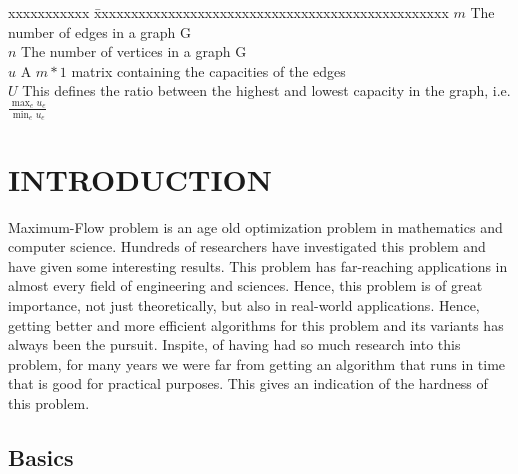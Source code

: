 \documentclass[BTech]{iitmdiss}
\begin{document}
 \begin{singlespace}
 \begin{tabbing}
 xxxxxxxxxxx \= xxxxxxxxxxxxxxxxxxxxxxxxxxxxxxxxxxxxxxxxxxxxxxxx \kill
 \textbf{$m$}  \> The number of edges in a graph G \\
 
 \textbf{$n$} \> The number of vertices in a graph G \\
 
 \textbf{$u$}  \> A $m \ast 1$ matrix containing the capacities of the edges \\
 
 \textbf{$U$}  \> This defines the ratio between the highest and lowest capacity in the graph, i.e.\\
		  \hspace{25mm}$\frac{\displaystyle\max_e u_e}{\displaystyle\min_e u_e}$ \\
 
 \end{tabbing}
 \end{singlespace}
 
 \pagebreak
 \clearpage




 \chapter{INTRODUCTION}
 \label{chap:intro}
    Maximum-Flow problem is an age old optimization problem in mathematics and computer science. Hundreds of researchers have investigated this problem
    and have given some interesting results. This problem has far-reaching applications in almost every field of engineering and sciences. Hence, this 
    problem is of great importance, not just theoretically, but also in real-world applications. Hence, getting better and more efficient algorithms
    for this problem and its variants has always been the pursuit. Inspite, of having had so much research into this problem, for many years we were far from getting an algorithm
    that runs in time that is good for practical purposes. This gives an indication of the hardness of this problem.
    
    \section{Basics}
\end{document}
